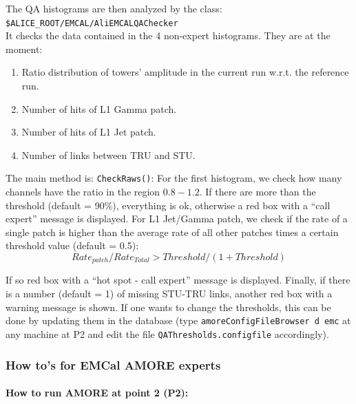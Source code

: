The QA histograms are then analyzed by the class:\\
\texttt{\$ALICE\_ROOT/EMCAL/AliEMCALQAChecker}\\
It checks the data contained in the 4 non-expert histograms. They are at the moment: 
\begin{enumerate}
\item Ratio distribution of towers' amplitude in the current run w.r.t. the reference run.
\item Number of hits of L1 Gamma patch.
\item Number of hits of L1 Jet patch.
\item Number of links between TRU and STU. 
\end{enumerate}
The main method is:
\texttt{CheckRaws()}: For the first histogram, we check how many
channels have the ratio in the region $0.8-1.2$. If there are more than
the threshold (default = 90\%), everything is ok, otherwise a red box with a ``call
expert'' message is displayed. For L1 Jet/Gamma patch, we check if the
rate of a single patch is higher than the average rate of all other
patches times a certain threshold value (default = 0.5):
\begin{equation}
Rate_{patch}/Rate_{Total} > Threshold /(1 + Threshold)
\end{equation}

 If so red box with a ``hot spot - call expert'' message is
 displayed. Finally, if there is a number (default = 1) of missing
 STU-TRU links, another red box with a warning message is shown.
If one wants to change the thresholds, this can be done by updating
them in the database (type \texttt{amoreConfigFileBrowser d emc} at
any machine at P2 and edit the file \texttt{QAThresholds.configfile} accordingly).

\subsubsection{How to's for EMCal AMORE experts}

\paragraph{How to run AMORE at point 2 (P2):}

